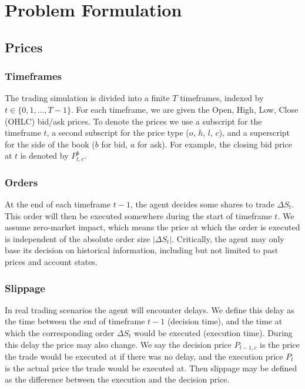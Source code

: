 \section{Problem Formulation}
\label{sec:problem}

\subsection{Prices}

\subsubsection{Timeframes}

The trading simulation is divided into a finite $T$ timeframes, indexed by $t \in \{0, 1, \dots, T-1\}$. For each timeframe, we are given the Open, High, Low, Close (OHLC) bid/ask prices. To denote the prices we use a subscript for the timeframe $t$, a second subscript for the price type ($o$, $h$, $l$, $c$), and a superscript for the side of the book ($b$ for bid, $a$ for ask). For example, the closing bid price at $t$ is denoted by $P_{t,c}^b$. 

\subsubsection{Orders}

At the end of each timeframe $t-1$, the agent decides some shares to trade $\Delta S_t$. This order will then be executed somewhere during the start of timeframe $t$. We assume zero-market impact, which means the price at which the order is executed is independent of the absolute order size $|\Delta S_t|$. Critically, the agent may only base its decision on historical information, including but not limited to past prices and account states.

\subsubsection{Slippage}

In real trading scenarios the agent will encounter delays. We define this delay as the time between the end of timeframe $t-1$ (decision time), and the time at which the corresponding order $\Delta S_t$  would be executed (execution time). During this delay the price may also change. We say the decision price $P_{t-1,c}$ is the price the trade would be executed at if there was no delay, and the execution price $P_t$ is the actual price the trade would be executed at. Then slippage may be defined as the difference between the execution and the decision price.

